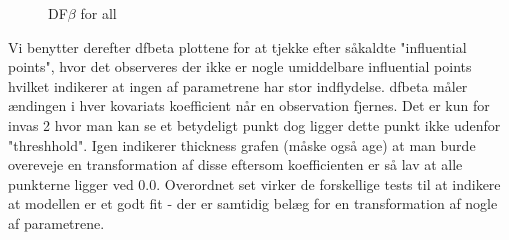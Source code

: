 \begin{figure}[h]
    \hfill
    \hfill
    \caption{DF$\beta$ for all}
\end{figure}




\noindent Vi benytter derefter dfbeta plottene for at tjekke efter såkaldte "influential points", hvor det observeres der ikke er nogle umiddelbare influential points hvilket indikerer at ingen af parametrene har stor indflydelse. dfbeta måler ændingen i hver kovariats koefficient når en observation fjernes. Det er kun for invas 2 hvor man kan se et betydeligt punkt dog ligger dette punkt ikke udenfor "threshhold". Igen indikerer thickness grafen (måske også age) at man burde overeveje en transformation af disse eftersom koefficienten er så lav at alle punkterne ligger ved 0.0.
\pause
Overordnet set virker de forskellige tests til at indikere at modellen er et godt fit - der er samtidig belæg for en transformation af nogle af parametrene.

